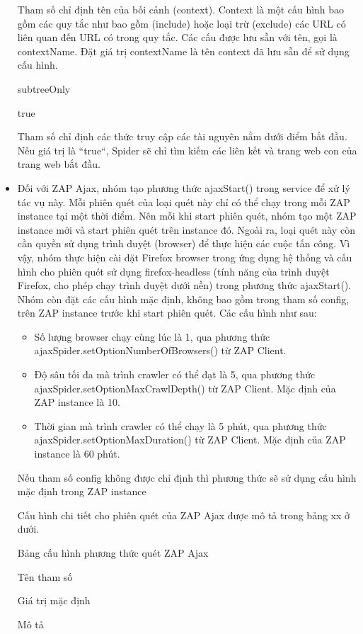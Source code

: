 \begin{itemize}
Tham số chỉ định tên của bối cảnh (context). Context là một cấu hình bao gồm các quy tắc như bao gồm (include) hoặc loại trừ (exclude) các URL có liên quan đến URL có trong quy tắc. Các cấu được lưu sẵn với tên, gọi là contextName. Đặt giá trị contextName là tên context đã lưu sẵn để sử dụng cấu hình.

subtreeOnly

true

Tham số chỉ định các thức truy cập các tài nguyên nằm dưới điểm bắt đầu. Nếu giá trị là “true“, Spider sẽ chỉ tìm kiếm các liên kết và trang web con của trang web bắt đầu.

  \item Đối với ZAP Ajax, nhóm tạo phương thức ajaxStart() trong service để xử lý tác vụ này. Mỗi phiên quét của loại quét này chỉ có thể chạy trong mỗi ZAP instance tại một thời điểm. Nên mỗi khi start phiên quét, nhóm tạo một ZAP instance mới và start phiên quét trên instance đó. Ngoài ra, loại quét này còn cần quyền sử dụng trình duyệt (browser) để thực hiện các cuộc tấn công. Vì vậy, nhóm thực hiện cài đặt Firefox browser trong ứng dụng hệ thống và cấu hình cho phiên quét sử dụng firefox-headless (tính năng của trình duyệt Firefox, cho phép chạy trình duyệt dưới nền) trong phương thức ajaxStart(). Nhóm còn đặt các cấu hình mặc định, không bao gồm trong tham số config, trên ZAP instance trước khi start phiên quét. Các cấu hình như sau: 
  \begin{itemize}
    \item Số lượng browser chạy cùng lúc là 1, qua phương thức ajaxSpider.setOptionNumberOfBrowsers() từ ZAP Client.
    \item Độ sâu tối đa mà trình crawler có thể đạt là 5, qua phương thức ajaxSpider.setOptionMaxCrawlDepth() từ ZAP Client. Mặc định của ZAP instance là 10.
    \item Thời gian mà trình crawler có thể chạy là 5 phút, qua phương thức ajaxSpider.setOptionMaxDuration() từ ZAP Client. Mặc định của ZAP instance là 60 phút.
  \end{itemize}
  Nếu tham số config không được chỉ định thì phương thức sẽ sử dụng cấu hình mặc định trong ZAP instance
  
Cấu hình chi tiết cho phiên quét của ZAP Ajax được mô tả trong bảng xx ở dưới.

Bảng cấu hình phương thức quét ZAP Ajax

Tên tham số

Giá trị mặc định

Mô tả


\end{itemize}
